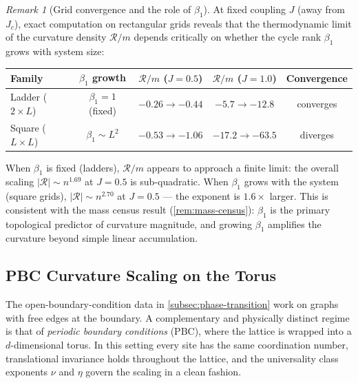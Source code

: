 \documentclass[11pt]{article}
\theoremstyle{definition}
\theoremstyle{remark}
\newtheorem{remark}[theorem]{Remark}
\newcommand{\betti}{\beta_1}
\newcommand{\Scal}{\mathcal{R}}
\begin{document}
\begin{remark}[Grid convergence and the role of $\betti$]
\label{rem:grid-convergence}
At fixed coupling $J$ (away from $J_c$), exact computation on rectangular
grids reveals that the thermodynamic limit of the curvature density
$\Scal / m$ depends critically on whether the cycle rank $\betti$
grows with system size:
\begin{center}
\renewcommand{\arraystretch}{1.15}
\begin{tabular}{lcccc}
\toprule
Family & $\betti$ growth & $\Scal/m$ ($J{=}0.5$) & $\Scal/m$ ($J{=}1.0$) & Convergence \\
\midrule
Ladder ($2 \times L$) & $\betti = 1$ (fixed) &
  $-0.26 \to -0.44$ & $-5.7 \to -12.8$ & converges \\
Square ($L \times L$) & $\betti \sim L^2$ &
  $-0.53 \to -1.06$ & $-17.2 \to -63.5$ & diverges \\
\bottomrule
\end{tabular}
\end{center}
When $\betti$ is fixed (ladders), $\Scal / m$ appears to approach a
finite limit: the overall scaling $|\Scal| \sim n^{1.69}$ at $J = 0.5$
is sub-quadratic. When $\betti$ grows with the system (square grids),
$|\Scal| \sim n^{2.70}$ at $J = 0.5$ --- the exponent is $1.6\times$
larger. This is consistent with the mass census result
(\cref{rem:mass-census}): $\betti$ is the primary topological
predictor of curvature magnitude, and growing $\betti$ amplifies the
curvature beyond simple linear accumulation.
\end{remark}

\subsection{PBC Curvature Scaling on the Torus}
\label{subsec:pbc-scaling}

The open-boundary-condition data in \cref{subsec:phase-transition} work on
graphs with free edges at the boundary. A complementary and physically
distinct regime is that of \emph{periodic boundary conditions} (PBC), where
the lattice is wrapped into a $d$-dimensional torus. In this setting every
site has the same coordination number, translational invariance holds
throughout the lattice, and the universality class exponents $\nu$ and $\eta$
govern the scaling in a clean fashion.
\end{document}
